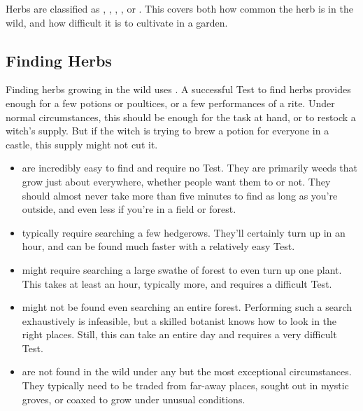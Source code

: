 Herbs are classified as , , , , or .
This covers both how common the herb is in the wild, and how difficult it is to cultivate in a garden.

\subsection{Finding Herbs}

Finding herbs growing in the wild uses .
A successful Test to find herbs provides enough for a few potions or poultices, or a few performances of a rite.
Under normal circumstances, this should be enough for the task at hand, or to restock a witch's supply.
But if the witch is trying to brew a potion for everyone in a castle, this supply might not cut it.

\begin{itemize}
	\item
		 are incredibly easy to find and require no Test.
		They are primarily weeds that grow just about everywhere, whether people want them to or not.
		They should almost never take more than five minutes to find as long as you're outside, and even less if you're in a field or forest.
	\item
		 typically require searching a few hedgerows.
		They'll certainly turn up in an hour, and can be found much faster with a relatively easy Test.
	\item
		 might require searching a large swathe of forest to even turn up one plant.
		This takes at least an hour, typically more, and requires a difficult Test.
	\item
		 might not be found even searching an entire forest.
		Performing such a search exhaustively is infeasible, but a skilled botanist knows how to look in the right places.
		Still, this can take an entire day and requires a very difficult Test.
	\item
		 are not found in the wild under any but the most exceptional circumstances.
		They typically need to be traded from far-away places, sought out in mystic groves, or coaxed to grow under unusual conditions.
\end{itemize}

